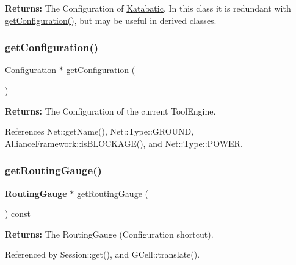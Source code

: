 {\bfseries Returns\+:} The Configuration of \hyperlink{namespaceKatabatic}{Katabatic}. In this class it is redundant with \hyperlink{classKatabatic_1_1KatabaticEngine_a9a7fbadfe526875680f698c76adfb128}{get\+Configuration()}, but may be useful in derived classes. \mbox{\label{classKatabatic_1_1KatabaticEngine_a9a7fbadfe526875680f698c76adfb128}} 
\subsubsection{\texorpdfstring{get\+Configuration()}{getConfiguration()}}
{\footnotesize\ttfamily Configuration $\ast$ get\+Configuration (\begin{DoxyParamCaption}{ }\end{DoxyParamCaption})\hspace{0.3cm}{\ttfamily [virtual]}}

{\bfseries Returns\+:} The Configuration of the current Tool\+Engine. 

References Net\+::get\+Name(), Net\+::\+Type\+::\+G\+R\+O\+U\+ND, Alliance\+Framework\+::is\+B\+L\+O\+C\+K\+A\+G\+E(), and Net\+::\+Type\+::\+P\+O\+W\+ER.

\mbox{\label{classKatabatic_1_1KatabaticEngine_a171ed6fac01ac5067d4f1b770cc419cf}} 
\subsubsection{\texorpdfstring{get\+Routing\+Gauge()}{getRoutingGauge()}}
{\footnotesize\ttfamily \textbf{ Routing\+Gauge} $\ast$ get\+Routing\+Gauge (\begin{DoxyParamCaption}{ }\end{DoxyParamCaption}) const\hspace{0.3cm}{\ttfamily [inline]}}

{\bfseries Returns\+:} The Routing\+Gauge (Configuration shortcut). 

Referenced by Session\+::get(), and G\+Cell\+::translate().


